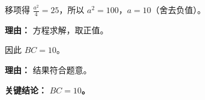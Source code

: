 \begin{examplebox}
\begin{description}[style=nextline, leftmargin=2.8em, labelsep=0.5em, itemsep=0.45em]
		\item[\textbf{第三步（解方程求 $a$）：}] 移项得 $\frac{a^{2}}{4} = 25$，所以 $a^{2}=100$，$a=10$（舍去负值）。
			\par\textbf{理由：} 方程求解，取正值。

		\item[\textbf{第四步（结论）：}] 因此 $BC=10$。
			\par\textbf{理由：} 结果符合题意。
	\end{description}

	\textbf{\textcolor{CExample}{关键结论：}}
	\textbf{$BC=10$。}

\end{examplebox}
